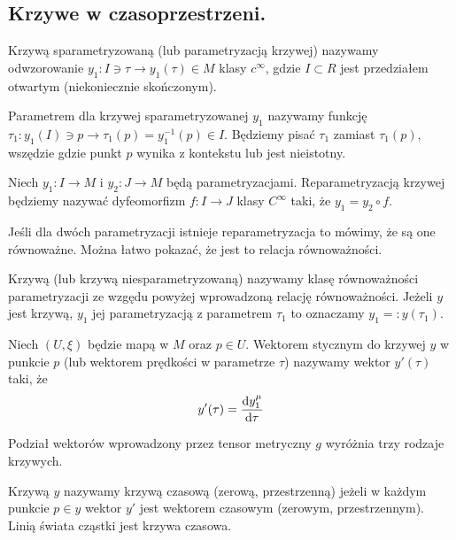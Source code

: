 \subsection{Krzywe w czasoprzestrzeni.}
\begin{definition}
Krzywą sparametryzowaną (lub parametryzacją krzywej) nazywamy 
odwzorowanie 
$ y_1 : I \ni \tau \to y_1(\tau) \in M$ klasy $c^\infty$, 
gdzie $I \subset R$ 
jest przedziałem otwartym (niekoniecznie skończonym).
\end{definition}
\begin{definition}
Parametrem dla krzywej sparametryzowanej $y_1$ 
nazywamy funkcję $ \tau_1: y_1(I) \ni p 
\to \tau_1(p) = y_1^{-1}( p )\in I$. 
Będziemy pisać
$\tau_1$ zamiast $\tau_1(p)$, wszędzie gdzie punkt $p$ 
wynika z kontekstu
lub jest nieistotny. 
\end{definition}
\begin{definition}
Niech $y_1: I \to M$ i $y_2:J\to M$ będą parametryzacjami.
Reparametryzacją krzywej będziemy nazywać dyfeomorfizm $f : I \to J$
klasy $C^\infty$
taki, że $y_1 = y_2 \circ f$.
\end{definition}
Jeśli dla dwóch parametryzacji istnieje reparametryzacja to 
mówimy, że są one równoważne. Można łatwo pokazać, że jest to
relacja równoważności. 
\begin{definition}
Krzywą (lub krzywą niesparametryzowaną) nazywamy klasę równoważności
parametryzacji ze wzgędu powyżej wprowadzoną relację równoważności.
Jeżeli $y$ jest krzywą, $y_1$ jej parametryzacją z parametrem $\tau_1$
to oznaczamy $y_1 =: y(\tau_1)$.
\end{definition}
\begin{definition}
Niech $(U,\xi)$ będzie mapą w $M$ oraz $p\in U$.
Wektorem stycznym do krzywej $y$ w punkcie $p$  
(lub wektorem prędkości w 
parametrze $\tau$) nazywamy wektor $y'(\tau)$ taki, że
\begin{align*}
y' (\tau )= \frac{\text{d} y_1^\mu }{\text{d} \tau}
\end{align*}
\end{definition}
Podział wektorów wprowadzony przez tensor metryczny $g$ 
wyróżnia trzy rodzaje krzywych. 
\begin{definition}
Krzywą $y$ nazywamy krzywą czasową (zerową, przestrzenną)
jeżeli w każdym punkcie $p \in y$ wektor $y'$ jest 
wektorem czasowym
(zerowym, przestrzennym). Linią świata cząstki
jest krzywa czasowa. 
\end{definition}
